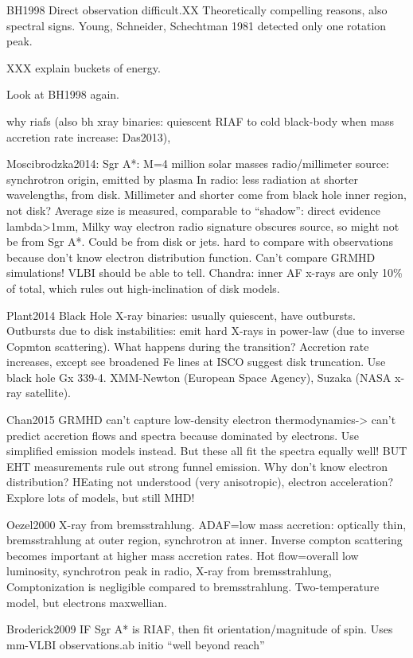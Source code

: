 BH1998
Direct observation difficult.XX
Theoretically compelling reasons, also spectral signs. Young, Schneider, Schechtman 1981 detected only one rotation peak.


XXX explain buckets of energy.

Look at BH1998 again.

why riafs (also bh xray binaries: quiescent RIAF to cold black-body when mass accretion rate increase: Das2013), 

Moscibrodzka2014:
Sgr A*: M=4 million solar masses
radio/millimeter source: synchrotron origin, emitted by plasma
In radio: less radiation at shorter wavelengths, from disk.
Millimeter and shorter come from black hole inner region, not disk?
Average size is measured, comparable to ``shadow'': direct evidence~
lambda>1mm, Milky way electron radio signature obscures source, so might not be from Sgr A*.
Could be from disk or jets. 
hard to compare with observations because don't know electron distribution function. Can't compare GRMHD simulations! VLBI should be able to tell.
Chandra: inner AF x-rays are only 10\% of total, which rules out high-inclination of disk models.

Plant2014
Black Hole X-ray binaries: usually quiescent, have outbursts. Outbursts due to disk instabilities: emit hard X-rays in power-law (due to inverse Copmton scattering). What happens during the transition? Accretion rate increases, except see broadened Fe lines at ISCO suggest disk truncation. Use black hole Gx 339-4. XMM-Newton (European Space Agency), Suzaka (NASA x-ray satellite).

Chan2015
GRMHD can't capture low-density electron thermodynamics-> can't predict accretion flows and spectra because dominated by electrons. Use simplified emission models instead. But these all fit the spectra equally well! BUT EHT measurements rule out strong funnel emission.
Why don't know electron distribution? HEating not understood (very anisotropic), electron acceleration?
Explore lots of models, but still MHD!

Oezel2000
X-ray from bremsstrahlung. ADAF=low mass accretion: optically thin, bremsstrahlung at outer region, synchrotron at inner. Inverse compton scattering becomes important at higher mass accretion rates.
Hot flow=overall low luminosity, synchrotron peak in radio, X-ray from bremsstrahlung, Comptonization is negligible compared to bremsstrahlung. Two-temperature model, but electrons maxwellian.

Broderick2009
IF Sgr A* is RIAF, then fit orientation/magnitude of spin. Uses mm-VLBI observations.ab initio ``well beyond reach''

